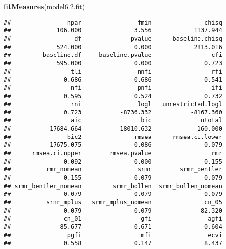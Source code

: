 \documentclass[english,man]{apa6}
\newenvironment{Shaded}{\begin{snugshade}}{\end{snugshade}}
\newcommand{\KeywordTok}[1]{\textcolor[rgb]{0.13,0.29,0.53}{\textbf{#1}}}
\newcommand{\FloatTok}[1]{\textcolor[rgb]{0.00,0.00,0.81}{#1}}
\newcommand{\NormalTok}[1]{#1}
\theoremstyle{definition}
\theoremstyle{definition}
\theoremstyle{definition}
\theoremstyle{remark}
\begin{document}
\begin{Shaded}
\begin{Highlighting}[]
\KeywordTok{fitMeasures}\NormalTok{(model6.}\FloatTok{2.}\NormalTok{fit)}
\end{Highlighting}
\end{Shaded}

\begin{verbatim}
##                npar                fmin               chisq 
##             106.000               3.556            1137.944 
##                  df              pvalue      baseline.chisq 
##             524.000               0.000            2813.016 
##         baseline.df     baseline.pvalue                 cfi 
##             595.000               0.000               0.723 
##                 tli                nnfi                 rfi 
##               0.686               0.686               0.541 
##                 nfi                pnfi                 ifi 
##               0.595               0.524               0.732 
##                 rni                logl   unrestricted.logl 
##               0.723           -8736.332           -8167.360 
##                 aic                 bic              ntotal 
##           17684.664           18010.632             160.000 
##                bic2               rmsea      rmsea.ci.lower 
##           17675.075               0.086               0.079 
##      rmsea.ci.upper        rmsea.pvalue                 rmr 
##               0.092               0.000               0.155 
##          rmr_nomean                srmr        srmr_bentler 
##               0.155               0.079               0.079 
## srmr_bentler_nomean         srmr_bollen  srmr_bollen_nomean 
##               0.079               0.079               0.079 
##          srmr_mplus   srmr_mplus_nomean               cn_05 
##               0.079               0.079              82.320 
##               cn_01                 gfi                agfi 
##              85.677               0.671               0.604 
##                pgfi                 mfi                ecvi 
##               0.558               0.147               8.437
\end{verbatim}
\end{document}
